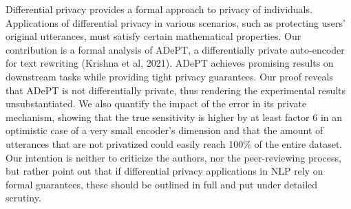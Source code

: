 Differential privacy provides a formal approach to privacy of individuals. Applications of differential privacy in various scenarios, such as protecting users' original utterances, must satisfy certain mathematical properties. Our contribution is a formal analysis of ADePT, a differentially private auto-encoder for text rewriting (Krishna et al, 2021). ADePT achieves promising results on downstream tasks while providing tight privacy guarantees. Our proof reveals that ADePT is not differentially private, thus rendering the experimental results unsubstantiated. We also quantify the impact of the error in its private mechanism, showing that the true sensitivity is higher by at least factor 6 in an optimistic case of a very small encoder's dimension and that the amount of utterances that are not privatized could easily reach 100\% of the entire dataset. Our intention is neither to criticize the authors, nor the peer-reviewing process, but rather point out that if differential privacy applications in NLP rely on formal guarantees, these should be outlined in full and put under detailed scrutiny.
